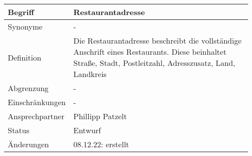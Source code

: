 \begin{table}[H]
    \centering
    \label{gls:restaurant}
    \begin{tabularx}{\textwidth}{| l | X |}
        \hline
        Begriff         & Restaurantadresse                                                                                                                                          \\
        \hline
        Synonyme        & -                                                                                                                                                          \\
        \hline
        Definition      & Die Restaurantadresse beschreibt die vollständige Anschrift eines Restaurants. Diese beinhaltet Straße, Stadt, Postleitzahl, Adresszusatz, Land, Landkreis \\
        \hline
        Abgrenzung      & -                                                                                                                                                          \\
        \hline
        Einschränkungen & -                                                                                                                                                          \\
        \hline
        Ansprechpartner & Phillipp Patzelt                                                                                                                                           \\
        \hline
        Status          & Entwurf                                                                                                                                                    \\
        \hline
        Änderungen      & 08.12.22: erstellt                                                                                                                                         \\
        \hline
    \end{tabularx}
\end{table}


